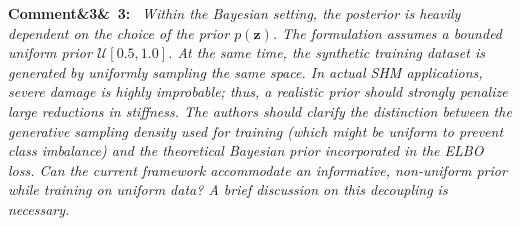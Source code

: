 \documentclass[11pt]{article}
\newenvironment{rcomment}[1]{\par\bigskip\noindent\textbf{Comment\ifx&#1&\else\ #1\fi:}\ \itshape}{\par}
\newenvironment{action}{\par\smallskip\noindent\color{resp}\textbf{Action:}\ }{\par}
\newcommand{\tbd}[1]{\textcolor{note}{\textsf{[#1]}}}
\newcommand{\lines}[1]{\tbd{lines #1}}
\newcommand{\z}{\mathbf{z}}
\begin{document}

\begin{rcomment}{3}
Within the Bayesian setting, the posterior is heavily dependent on the choice of the prior $p(\z)$. The formulation
assumes a bounded uniform prior $\mathcal{U}[0.5,1.0]$. At the same time, the synthetic training dataset is generated
by uniformly sampling the same space. In actual SHM applications, severe damage is highly improbable; thus, a realistic
prior should strongly penalize large reductions in stiffness. The authors should clarify the distinction between the
generative sampling density used for training (which might be uniform to prevent class imbalance) and the theoretical
Bayesian prior incorporated in the ELBO loss. Can the current framework accommodate an informative, non-uniform prior
while training on uniform data? A brief discussion on this decoupling is necessary.
\end{rcomment}
\end{document}
